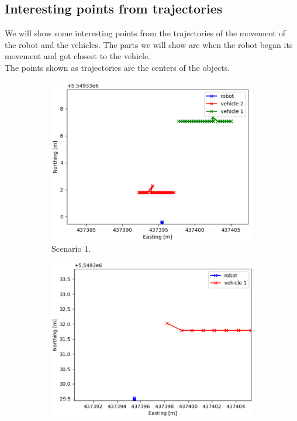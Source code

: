     \subsection{Interesting points from trajectories}
        We will show some interesting points from the trajectories of the movement of the robot and the vehicles. The parts we will show are when the robot began its movement and got closest to the vehicle.\\
        The points shown as trajectories are the centers of the objects.
        \begin{figure}[H]
            \centering
            \begin{subfigure}{0.32\linewidth}
                \centering
                \includegraphics[width=\linewidth]{images/simulations/start_1.png}
                \caption{Scenario 1.}
            \end{subfigure}
            \begin{subfigure}{0.32\linewidth}
                \centering
                \includegraphics[width=\linewidth]{images/simulations/start_2_2.png}

\end{subfigure}
\end{figure}
